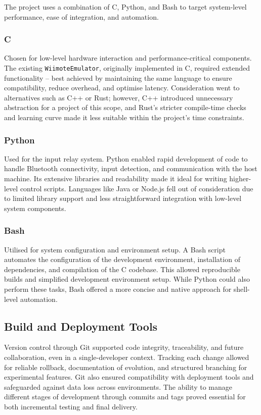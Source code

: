The project uses a combination of C, Python, and Bash to target system-level performance, ease of integration, and automation.

\subsubsection{C}
Chosen for low-level hardware interaction and performance-critical components. The existing \texttt{WiimoteEmulator}, originally implemented in C, required extended functionality -- best achieved by maintaining the same language to ensure compatibility, reduce overhead, and optimise latency. Consideration went to alternatives such as C++ or Rust; however, C++ introduced unnecessary abstraction for a project of this scope, and Rust's stricter compile-time checks and learning curve made it less suitable within the project's time constraints.

\subsubsection{Python}
Used for the input relay system. Python enabled rapid development of code to handle Bluetooth connectivity, input detection, and communication with the host machine. Its extensive libraries and readability made it ideal for writing higher-level control scripts. Languages like Java or Node.js fell out of consideration due to limited library support and less straightforward integration with low-level system components.

\subsubsection{Bash}
Utilised for system configuration and environment setup. A Bash script automates the configuration of the development environment, installation of dependencies, and compilation of the C codebase. This allowed reproducible builds and simplified development environment setup. While Python could also perform these tasks, Bash offered a more concise and native approach for shell-level automation.

\subsection{Build and Deployment Tools}
Version control through Git supported code integrity, traceability, and future collaboration, even in a single-developer context. Tracking each change allowed for reliable rollback, documentation of evolution, and structured branching for experimental features. Git also ensured compatibility with deployment tools and safeguarded against data loss across environments. The ability to manage different stages of development through commits and tags proved essential for both incremental testing and final delivery.
